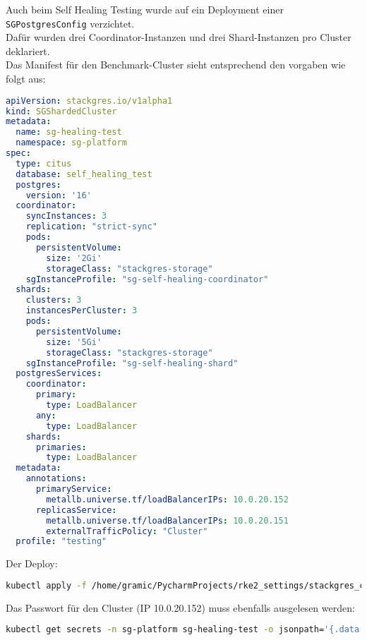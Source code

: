 Auch beim Self Healing Testing wurde auf ein Deployment einer \texttt{SGPostgresConfig} verzichtet.\\
Dafür wurden drei Coordinator-Instanzen und drei Shard-Instanzen pro Cluster deklariert.\\
Das Manifest für den Benchmark-Cluster sieht entsprechend den vorgaben wie folgt aus:
\lstset{style=gra_codestyle}
\begin{lstlisting}[language=yaml, caption=StackGres-Citus - Self Healing Testing - SGShardedCluster,captionpos=b,label={lst:SGShardedCluster_self_healing_test.yaml},breaklines=true]
apiVersion: stackgres.io/v1alpha1
kind: SGShardedCluster
metadata:
  name: sg-healing-test
  namespace: sg-platform
spec:
  type: citus
  database: self_healing_test
  postgres:
    version: '16'
  coordinator:
    syncInstances: 3
    replication: "strict-sync"
    pods:
      persistentVolume:
        size: '2Gi'
        storageClass: "stackgres-storage"
    sgInstanceProfile: "sg-self-healing-coordinator"
  shards:
    clusters: 3
    instancesPerCluster: 3
    pods:
      persistentVolume:
        size: '5Gi'
        storageClass: "stackgres-storage"
    sgInstanceProfile: "sg-self-healing-shard"
  postgresServices:
    coordinator:
      primary:
        type: LoadBalancer
      any:
        type: LoadBalancer
    shards:
      primaries:
        type: LoadBalancer
  metadata:
    annotations:
      primaryService:
        metallb.universe.tf/loadBalancerIPs: 10.0.20.152
      replicasService:
        metallb.universe.tf/loadBalancerIPs: 10.0.20.151
        externalTrafficPolicy: "Cluster"
  profile: "testing"
\end{lstlisting}
Der Deploy:
\lstset{style=gra_codestyle}
\begin{lstlisting}[language=bash, caption=StackGres-Citus - Self Healing Testing - Cluster Deploy,captionpos=b,label={lst:stackgres_citus-self-healing-test-deploy-cluster},breaklines=true]
kubectl apply -f /home/gramic/PycharmProjects/rke2_settings/stackgres_citus/stackgres_citus/SGShardedCluster_self_healing_test.yaml
\end{lstlisting}

Das Passwort für den Cluster (IP 10.0.20.152) muss ebenfalls ausgelesen werden:
\lstset{style=gra_codestyle}
\begin{lstlisting}[language=bash, caption=StackGres-Citus - Self Healing Testing DB Passwort,captionpos=b,label={lst:stackgres_citus-get-self-healing-testing-cluster-passwd},breaklines=true]
kubectl get secrets -n sg-platform sg-healing-test -o jsonpath='{.data.superuser-password}' | base64 -d
\end{lstlisting}

